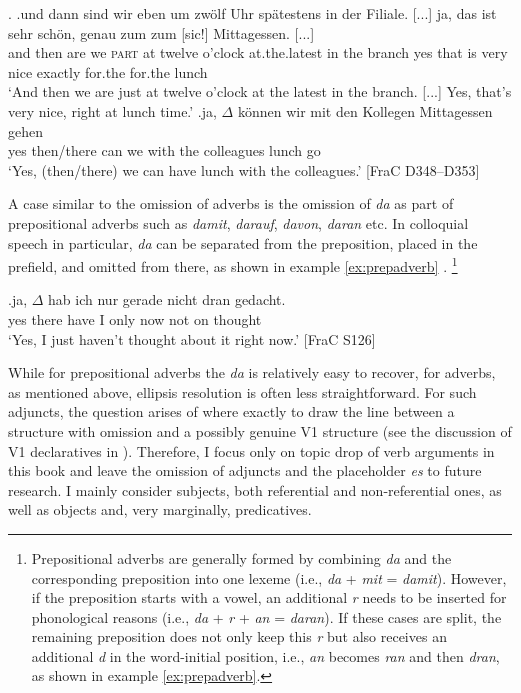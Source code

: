 \ex.\label{ex:td.adverb}
\ag.und dann sind wir eben um zwölf Uhr spätestens in der Filiale. [...] ja, das ist sehr schön, genau zum zum [sic!] Mittagessen. [...]\\
and then are we \textsc{part} at twelve o'clock at.the.latest in the branch {} yes that is very nice exactly for.the for.the {} lunch {}\\
`And then we are just at twelve o'clock at the latest in the branch. [...] Yes, that's very nice, right at lunch time.'
\bg.ja, $\Delta$ können wir mit den Kollegen Mittagessen gehen\\
yes then/there can we with the colleagues lunch go\\
`Yes, (then/there) we can have lunch with the colleagues.' [FraC D348--D353]

A case similar to the omission of adverbs is the omission of \textit{da} as part of prepositional adverbs such as \textit{damit}, \textit{darauf}, \textit{davon}, \textit{daran} etc.
In colloquial speech in particular, \textit{da} can be separated from the preposition, placed in the prefield, and omitted from there, as shown in example \ref{ex:prepadverb} \citep[see][for details]{fries1988,reis2000}.%
\footnote{Prepositional adverbs are generally formed by combining \textit{da} and the corresponding preposition into one lexeme (i.e., \textit{da} + \textit{mit} = \textit{damit}).
However, if the preposition starts with a vowel, an additional \textit{r} needs to be inserted for phonological reasons (i.e., \textit{da} + \textit{r} + \textit{an} = \textit{daran}).
If these cases are split, the remaining preposition does not only keep this \textit{r} but also receives an additional \textit{d} in the word-initial position, i.e., \textit{an} becomes \textit{ran} and then \textit{dran}, as shown in example \ref{ex:prepadverb}.}
%

\exg.\label{ex:prepadverb}ja, $\Delta$ hab ich nur gerade nicht dran gedacht.\\
yes there have I only now not on thought\\
`Yes, I just haven't thought about it right now.' [FraC S126]

While for prepositional adverbs the \textit{da} is relatively easy to recover,  for adverbs, as mentioned above, ellipsis resolution is often less straightforward.
For such adjuncts,  the question arises of where exactly to draw the line between a structure with omission and a possibly genuine V1 structure (see the discussion of V1 declaratives  in ).
Therefore, I focus only on topic drop of verb arguments  in this book and leave the omission of adjuncts  and the placeholder \textit{es} to future research.
I mainly consider subjects, both referential and non-referential ones, as well as objects and, very marginally, predicatives.

